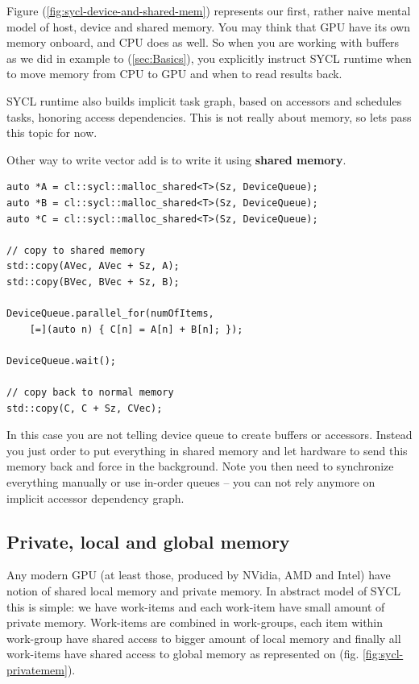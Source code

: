 \documentclass[a4paper,12pt,oneside]{article}
\begin{document}
Figure (\ref{fig:sycl-device-and-shared-mem}) represents our first, rather naive mental model of host, device and shared memory. You may think that GPU have its own memory onboard, and CPU does as well. So when you are working with buffers as we did in example to (\ref{sec:Basics}), you explicitly instruct SYCL runtime when to move memory from CPU to GPU and when to read results back.

SYCL runtime also builds implicit task graph, based on accessors and schedules tasks, honoring access dependencies. This is not really about memory, so lets pass this topic for now.

Other way to write vector add is to write it using \textbf{shared memory}.

\begin{lstlisting}[caption={Vector addition in shared memory},label={lst:vectoraddshared}]
auto *A = cl::sycl::malloc_shared<T>(Sz, DeviceQueue);
auto *B = cl::sycl::malloc_shared<T>(Sz, DeviceQueue);
auto *C = cl::sycl::malloc_shared<T>(Sz, DeviceQueue);

// copy to shared memory
std::copy(AVec, AVec + Sz, A);
std::copy(BVec, BVec + Sz, B);

DeviceQueue.parallel_for(numOfItems,
    [=](auto n) { C[n] = A[n] + B[n]; });

DeviceQueue.wait();

// copy back to normal memory
std::copy(C, C + Sz, CVec);
\end{lstlisting}

In this case you are not telling device queue to create buffers or accessors. Instead you just order to put everything in shared memory and let hardware to send this memory back and force in the background. Note you then need to synchronize everything manually or use in-order queues -- you can not rely anymore on implicit accessor dependency graph.

\subsection{Private, local and global memory}\label{subsec:PrivLocal}


Any modern GPU (at least those, produced by NVidia, AMD and Intel) have notion of shared local memory and private memory. In abstract model of SYCL this is simple: we have work-items and each work-item have small amount of private memory. Work-items are combined in work-groups, each item within work-group have shared access to bigger amount of local memory and finally all work-items have shared access to global memory as represented on (fig. \ref{fig:sycl-privatemem}).
\end{document}
